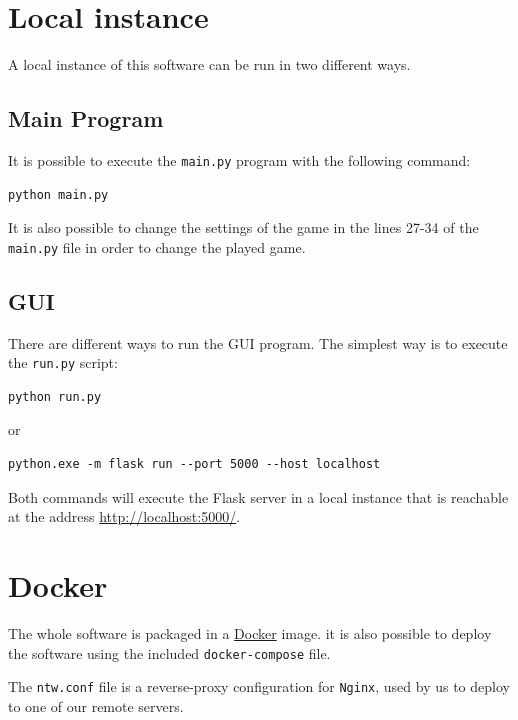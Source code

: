 \documentclass[a4paper]{article}
\begin{document}
	\section{Local instance}

	A local instance of this software can be run in two different ways.
	
	\subsection{Main Program}
	
	It is possible to execute the \texttt{main.py} program with the following command:
	
	\begin{lstlisting}
python main.py\end{lstlisting}

	It is also possible to change the settings of the game in the lines 27-34 of the \texttt{main.py} file in order to change the played game.

	\subsection{GUI}

	There are different ways to run the GUI program. The simplest way is to execute the \texttt{run.py} script:

	\begin{lstlisting}
python run.py\end{lstlisting}

	or

	\begin{lstlisting}
python.exe -m flask run --port 5000 --host localhost\end{lstlisting}

	Both commands will execute the Flask server in a local instance that is reachable at the address \href{http://localhost:5000/}{http://localhost:5000/}.


	\section{Docker}

	The whole software is packaged in a \href{https://www.docker.com/}{Docker} image. it is also possible to deploy the software using the included \texttt{docker-compose} file.

	The \texttt{ntw.conf} file is a reverse-proxy configuration for \texttt{Nginx}, used by us to deploy to one of our remote servers.
\end{document}
